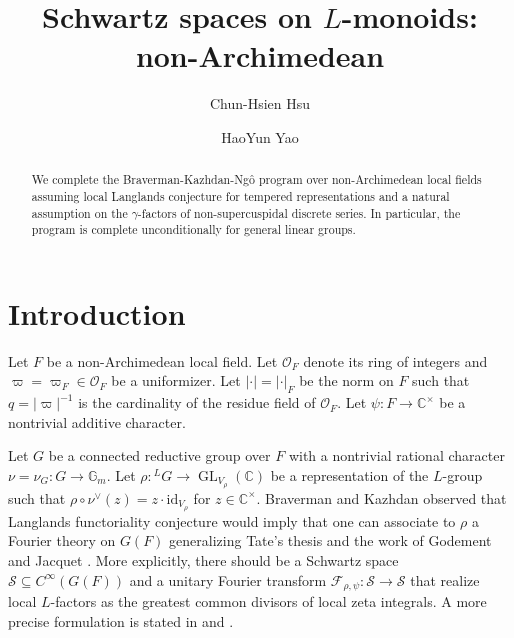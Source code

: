 \documentclass[10pt]{amsart}
\theoremstyle{definition}
\numberwithin{equation}{section}
\DeclareMathOperator{\GL}{\mathrm{GL}}
\numberwithin{equation}{subsection}
\begin{document}
\author{Chun-Hsien Hsu}
\address{Department of Mathematics\\
University of Chicago\\
Chicago, IL 60637}


\author{HaoYun Yao}
\address{Department of Mathematics\\
Duke University\\
Durham, NC 27708}


\title{Schwartz spaces on $L$-monoids: non-Archimedean}

\begin{abstract}
    We complete the Braverman-Kazhdan-Ng\^{o} program over non-Archimedean local fields assuming local Langlands conjecture for tempered representations and a natural assumption on the $\gamma$-factors of non-supercuspidal discrete series. In particular, the program is complete unconditionally for general linear groups.
\end{abstract}

\maketitle 
\tableofcontents

\section{Introduction} 

Let $F$ be a non-Archimedean local field. Let $\mathcal{O}_F$ denote its ring of integers and $\varpi=\varpi_F\in \mathcal{O}_F$ be a uniformizer. Let $|\cdot|=|\cdot|_F$ be the norm on $F$ such that $q=|\varpi|^{-1}$ is the cardinality of the residue field of $\mathcal{O}_F$. Let $\psi:F\to\mathbb{C}^\times$ be a nontrivial additive character.

Let $G$ be a connected reductive group over $F$ with a nontrivial rational character $\nu=\nu_G:G\longrightarrow\mathbb{G}_m$. Let $\rho:{}^LG\to \GL_{V_\rho}(\mathbb{C})$ be a representation of the $L$-group such that $\rho\circ\nu^\vee(z) =z\cdot\mathrm{id}_{V_\rho}$ for $z\in\mathbb{C}^\times.$ Braverman and Kazhdan \cite{BK-lifting} observed that Langlands functoriality conjecture would imply that one can associate to $\rho$ a Fourier theory on $G(F)$ generalizing Tate's thesis and the work of Godement and Jacquet \cite{GodementJacquetBook}. More explicitly, there should be a Schwartz space $\mathcal{S}\subseteq C^\infty(G(F))$ and a unitary Fourier transform $\mathcal{F}_{\rho,\psi}:\mathcal{S}\longrightarrow \mathcal{S}$ that realize local $L$-factors as the greatest common divisors of local zeta integrals. A more precise formulation is stated in  \cite[\S4]{Ngo:Hankel} and \cite[\S2]{Luo:Ngo}. 
\end{document}
